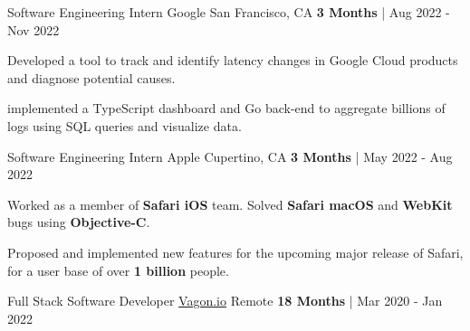 
\begin{cventries}
\vspace{-1mm}
  \cvexpentry
   {Software Engineering Intern} %
    {Google} %
    {San Francisco, CA} %
    {\textbf{3 Months} | Aug 2022 - Nov 2022} %
    {
      \begin{cvitems} %
        \item {Developed a tool to track and identify latency changes in Google Cloud products and diagnose potential causes.}
        \item {implemented a TypeScript dashboard and Go back-end to aggregate billions of logs using SQL queries and visualize data.}
      \end{cvitems}
    }
  \cvexpentry
   {Software Engineering Intern} %
    {Apple} %
    {Cupertino, CA} %
    {\textbf{3 Months} | May 2022 - Aug 2022} %
    {
      \begin{cvitems} %
        \item {Worked as a member of \textbf{Safari iOS} team. Solved \textbf{Safari macOS} and \textbf{WebKit} bugs using \textbf{Objective-C}. }
        \item {Proposed and implemented new features for the upcoming major release of Safari, for a user base of over \textbf{1 billion} people.}
      \end{cvitems}
    }
  \cvexpentry
   {Full Stack Software Developer} %
    {\href{https://vagon.io}{Vagon.io}} %
    {Remote} %
    {\textbf{18 Months} | Mar 2020 - Jan 2022} %
    {
      \begin{cvitems} %

\end{cvitems}}
\end{cventries}
